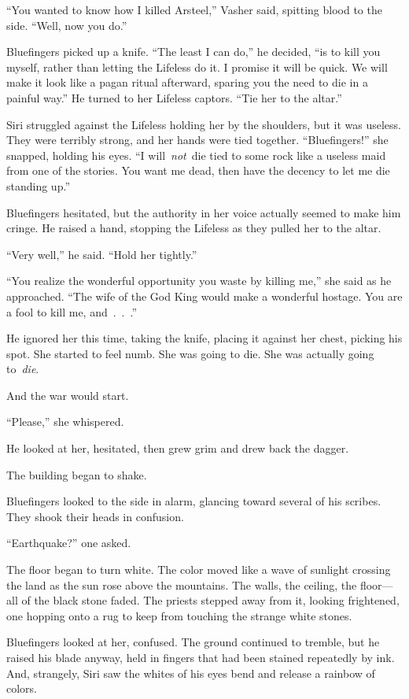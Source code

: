 “You wanted to know how I killed Arsteel,” Vasher said, spitting blood to the side. “Well, now you do.”

\orn

Bluefingers picked up a knife. “The least I can do,” he decided, “is to kill you myself, rather than letting the Lifeless do it. I promise it will be quick. We will make it look like a pagan ritual afterward, sparing you the need to die in a painful way.” He turned to her Lifeless captors. “Tie her to the altar.”

Siri struggled against the Lifeless holding her by the shoulders, but it was useless. They were terribly strong, and her hands were tied together. “Bluefingers!” she snapped, holding his eyes. “I will~\textit{not}~die tied to some rock like a useless maid from one of the stories. You want me dead, then have the decency to let me die standing up.”

Bluefingers hesitated, but the authority in her voice actually seemed to make him cringe. He raised a hand, stopping the Lifeless as they pulled her to the altar.

“Very well,” he said. “Hold her tightly.”

“You realize the wonderful opportunity you waste by killing me,” she said as he approached. “The wife of the God King would make a wonderful hostage. You are a fool to kill me, and~.~.~.”

He ignored her this time, taking the knife, placing it against her chest, picking his spot. She started to feel numb. She was going to die. She was actually going to~\textit{die}.

And the war would start.

“Please,” she whispered.

He looked at her, hesitated, then grew grim and drew back the dagger.

The building began to shake.

Bluefingers looked to the side in alarm, glancing toward several of his scribes. They shook their heads in confusion.

“Earthquake?” one asked.

The floor began to turn white. The color moved like a wave of sunlight crossing the land as the sun rose above the mountains. The walls, the ceiling, the floor—all of the black stone faded. The priests stepped away from it, looking frightened, one hopping onto a rug to keep from touching the strange white stones.

Bluefingers looked at her, confused. The ground continued to tremble, but he raised his blade anyway, held in fingers that had been stained repeatedly by ink. And, strangely, Siri saw the whites of his eyes bend and release a rainbow of colors.

